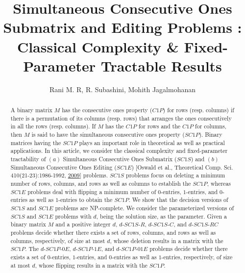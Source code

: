 \documentclass[review, 1p]{elsarticle}
\begin{document}
\newsavebox{\mybox}
\begin{frontmatter}

\title{Simultaneous Consecutive Ones Submatrix and Editing Problems : Classical Complexity \& Fixed-Parameter Tractable Results }

\author{Rani M. R, R. Subashini, Mohith Jagalmohanan}
\address{Department of Computer Science \& Engineering.\\ National Institute of Technology, Calicut\\
 \texttt{\{rani\_p150067cs, suba\}@nitc.ac.in}}

\begin{abstract}
A binary matrix $M$ has the consecutive ones property ($C1P$) for rows (resp. columns) if there is a permutation of its columns (resp. rows) that arranges the ones consecutively in all the rows (resp. columns). If $M$ has the $C1P$ for rows and the $C1P$ for columns, then $M$ is said to have the simultaneous consecutive ones property ($SC1P$). Binary matrices having the $SC1P$ plays an important role in theoretical as well as practical applications. \newline \newline In this article, we consider the classical complexity and fixed-parameter tractability of $(a)$ Simultaneous Consecutive Ones Submatrix ($SC1S$) and $(b)$ Simultaneous Consecutive Ones Editing ($SC1E$) [Oswald et al., Theoretical Comp. Sci. 410(21-23):1986-1992, \hyperref[references]{2009}] problems. $SC1S$ problems focus on deleting a minimum number of rows, columns, and rows as well as columns to establish the $SC1P$, whereas $SC1E$ problems deal with flipping a minimum number of $0$-entries, $1$-entries, and $0$-entries as well as $1$-entries to obtain the $SC1P$.  We show that the decision versions of $SC1S$ and $SC1E$ problems are NP-complete. \newline \newline We consider the parameterized versions of $SC1S$ and $SC1E$ problems with $d$, being the solution size, as the parameter. Given a binary matrix $M$ and a positive integer $d$, $d$-$SC1S$-$R$, $d$-$SC1S$-$C$, and  $d$-$SC1S$-$RC$ problems decide whether there exists a set of rows, columns, and rows as well as columns, respectively, of size at most $d$, whose deletion results in a matrix with the $SC1P$. The $d$-$SC1P$-$0E$, $d$-$SC1P$-$1E$, and $d$-$SC1P$-$01E$ problems decide whether there exists a set of $0$-entries, $1$-entries, and $0$-entries as well as $1$-entries, respectively, of size at most $d$, whose flipping results in a matrix with the \vspace{0.095 in} $SC1P$. 


\end{abstract}
\end{frontmatter}
\end{document}
